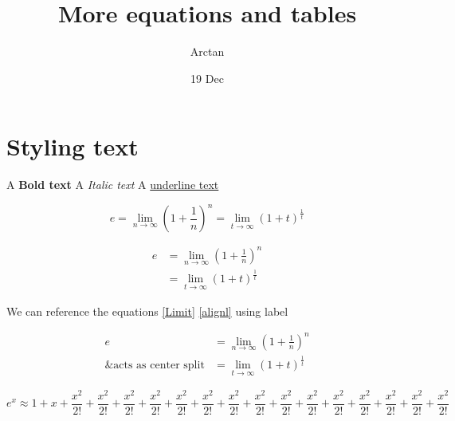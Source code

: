 \documentclass{article}
\title{More equations and tables}
\author{Arctan}
\date{19 Dec}
\begin{document}
\maketitle

\section{Styling text}

A \textbf{Bold text}
A \textit{Italic text}
A \underline{underline text}

    \begin{equation}
    \label{Limit}
        e = \lim_{n\to\infty}\left(1+\frac{1}{n}\right)^n
          = \lim_{t\to\infty}(1+t)^\frac{1}{t}
    \end{equation}

    \begin{align}
    \label{alignl}
        e& = \lim_{n\to\infty}\left(1+\frac{1}{n}\right)^n \\ 
          &= \lim_{t\to\infty}(1+t)^\frac{1}{t}
    \end{align}

    We can reference the equations \ref{Limit} \ref{alignl} using label 

    \begin{equation}
    \begin{split}
        e &= \lim_{n\to\infty}\left(1+\frac{1}{n}\right)^n \\
        \text{\& acts as center split}  &= \lim_{t\to\infty}(1+t)^\frac{1}{t}
    \end{split} 
    \end{equation}

    \begin{equation}
        e^x \approx 1 + x + \frac{x^2}{2!} + \frac{x^2}{2!}+ \frac{x^2}{2!}+ \frac{x^2}{2!}+ \frac{x^2}{2!}+ \frac{x^2}{2!}+ \frac{x^2}{2!}+ \frac{x^2}{2!}+ \frac{x^2}{2!}+ \frac{x^2}{2!}+ \frac{x^2}{2!}+ \frac{x^2}{2!}+ \frac{x^2}{2!}+ \frac{x^2}{2!}+ \frac{x^2}{2!}
    \end{equation}
\end{document}
